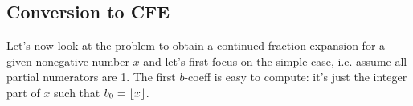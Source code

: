 









\subsection{Conversion to CFE}
Let's now look at the problem to obtain a continued fraction expansion for a given nonegative number $x$ and let's first focus on the simple case, i.e. assume all partial numerators are 1. The first $b$-coeff is easy to compute: it's just the integer part of $x$ such that $b_0 = \lfloor x\rfloor$. 


